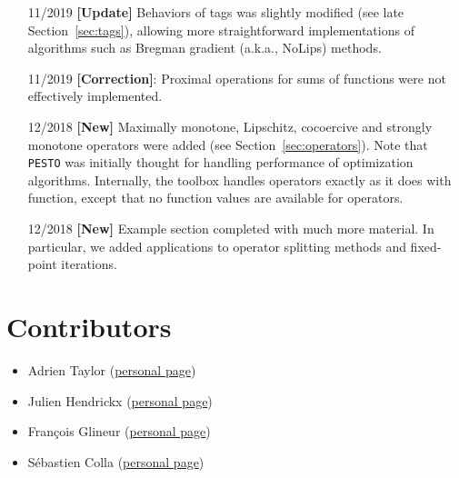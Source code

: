 \documentclass[11pt,a4paper]{article}
\begin{document}
\begin{itemize}
		\item[11/2019] {\bf{}[Update]} Behaviors of tags was slightly modified (see late Section~\ref{sec:tags}), allowing more straightforward implementations of algorithms such as Bregman gradient (a.k.a., NoLips) methods.
		\item[11/2019] {\bf{}[Correction]}: Proximal operations for sums of functions were not effectively implemented.
		\item[12/2018] {\bf{}[New]} Maximally monotone, Lipschitz, cocoercive and strongly monotone operators were added (see Section~\ref{sec:operators}). Note that \verb|PESTO| was initially thought for handling performance of optimization algorithms. Internally, the toolbox handles operators exactly as it does with function, except that no function values are available for operators.
		\item[12/2018] {\bf{}[New]} Example section completed with much more material. In particular, we added applications to operator splitting methods and fixed-point iterations.
	\end{itemize}

	\section*{Contributors}
	\begin{itemize}
		\item Adrien Taylor (\href{http://www.di.ens.fr/~ataylor/}{personal page})
		\item Julien Hendrickx (\href{https://perso.uclouvain.be/julien.hendrickx/index.html}{personal page})
		\item Fran\c{c}ois Glineur (\href{https://perso.uclouvain.be/francois.glineur/}{personal page})
		\item S\'ebastien Colla (\href{https://perso.uclouvain.be/sebastien.colla/}{personal page})
	\end{itemize}
\end{document}
